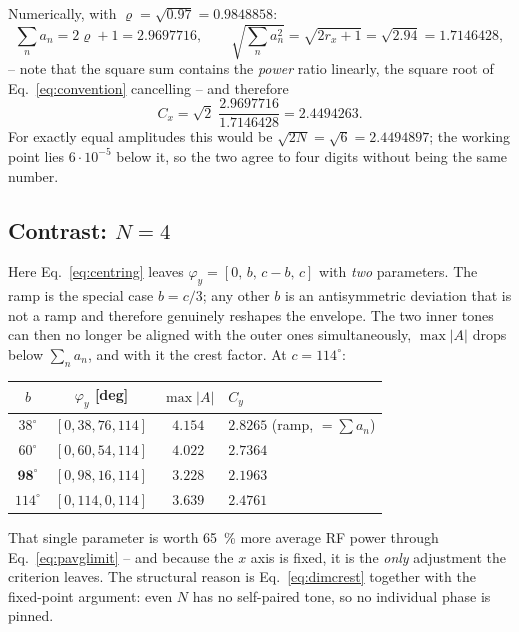 \documentclass[11pt,a4paper]{article}
\newcommand{\crest}{\ensuremath{C}}
\begin{document}
\medskip
\noindent Numerically, with $\varrho=\sqrt{0.97}=0.9848858$:
\begin{equation}
  \sum_n a_n = 2\varrho+1 = 2.9697716 ,
  \qquad
  \sqrt{\textstyle\sum_n a_n^2} = \sqrt{2r_x+1} = \sqrt{2.94} = 1.7146428 ,
\end{equation}
-- note that the square sum contains the \emph{power} ratio linearly, the
square root of Eq.~\eqref{eq:convention} cancelling -- and therefore
\begin{equation}
  \crest_x = \sqrt2\;\frac{2.9697716}{1.7146428} = 2.4494263 .
\end{equation}
For exactly equal amplitudes this would be $\sqrt{2N}=\sqrt6 = 2.4494897$;
the working point lies $6\cdot10^{-5}$ below it, so the two agree to four
digits without being the same number.

\subsection{Contrast: \boldmath$N=4$}

Here Eq.~\eqref{eq:centring} leaves $\varphi_y = [0,\,b,\,c-b,\,c]$ with
\emph{two} parameters. The ramp is the special case $b=c/3$; any other $b$ is
an antisymmetric deviation that is not a ramp and therefore genuinely
reshapes the envelope. The two inner tones can then no longer be aligned with
the outer ones simultaneously, $\max|A|$ drops below $\sum_n a_n$, and with
it the crest factor. At $c=114^\circ$:

\begin{center}
\begin{tabular}{cccl}
  \toprule
  $b$ & $\varphi_y$ [deg] & $\max|A|$ & $\crest_y$\\
  \midrule
  $38^\circ$ & $[0,38,76,114]$ & $4.154$ & $2.8265$ \quad(ramp, $=\sum a_n$)\\
  $60^\circ$ & $[0,60,54,114]$ & $4.022$ & $2.7364$\\
  $\mathbf{98^\circ}$ & $[0,98,16,114]$ & $\mathbf{3.228}$ & $\mathbf{2.1963}$\\
  $114^\circ$ & $[0,114,0,114]$ & $3.639$ & $2.4761$\\
  \bottomrule
\end{tabular}
\end{center}

\noindent That single parameter is worth \SI{65}{\percent} more average RF
power through Eq.~\eqref{eq:pavglimit} -- and because the $x$ axis is fixed,
it is the \emph{only} adjustment the criterion leaves. The structural reason
is Eq.~\eqref{eq:dimcrest} together with the fixed-point argument: even $N$
has no self-paired tone, so no individual phase is pinned.
\end{document}
